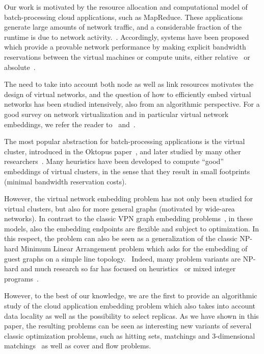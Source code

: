 \documentclass[9pt,twocolumn]{scrartcl}
\begin{document}
Our work is motivated by the resource allocation and computational model of
batch-processing cloud applications, such as MapReduce. 
These applications 
generate large amounts of network traffic, and a considerable
fraction of the runtime is due to network acti\-vi\-ty.~\cite{talk-about,amazonbw,orchestra}.
Accordingly, systems have been proposed which provide
a provable network performance by making explicit bandwidth reservations
between the virtual machines or compute units, either relative~\cite{seawall,faircloud,elasticswitch} 
or absolute~\cite{secondnet,oktopus, proteus, drl, gatekeeper}. 

The need to take into account both node as well as link resources motivates
the design of virtual networks, and the question of how to efficiently embed virtual networks
has been studied intensively, also from an algorithmic perspective.
For a good survey on network virtualization and in particular virtual network embeddings,
we refer the reader to~\cite{boutaba-survey} and~\cite{fischer-survey}.

The most popular abstraction for batch-processing applications is the virtual cluster,
introduced in the Oktopus paper~\cite{oktopus}, and later studied by many other researchers~\cite{proteus}. 
Many heuristics have been developed to compute ``good'' embeddings of virtual clusters, in the sense that
they result in small footprints (minimal bandwidth reservation costs). 

However, the virtual network embedding problem has not only been studied for virtual clusters,
but also for more general graphs (motivated by wide-area networks). In contrast to the classic VPN 
graph embedding problems~\cite{gupta2001provisioning,Goyal2008},
in these models, also the embedding endpoints are flexible and subject to optimization. 
In this respect, the problem can also be seen as a generalization of the classic NP-hard Minimum Linear Arrangement problem which asks for the
embedding of guest graphs on a simple line topology.~\cite{mla,mla-survey,mla-feige}
Indeed, many problem variants are NP-hard and much research so far has focused on heuristics~\cite{ammar,zhu06,simannealing,turner}
or mixed integer programs~\cite{infocom2009,ucc12mip}.

However, to the best of our knowledge, we are the first to provide an algorithmic
study of the cloud application embedding problem which also takes into account
data locality as well as the possibility to select replicas. As we have shown in this paper,
the resulting problems can be seen as interesting new variants of several classic optimization
problems, such as hitting sets, matchings and 3-dimensional matchings~\cite{3SC-hard} as well as cover and flow problems.~\cite{korte2002combinatorial}
\end{document}
